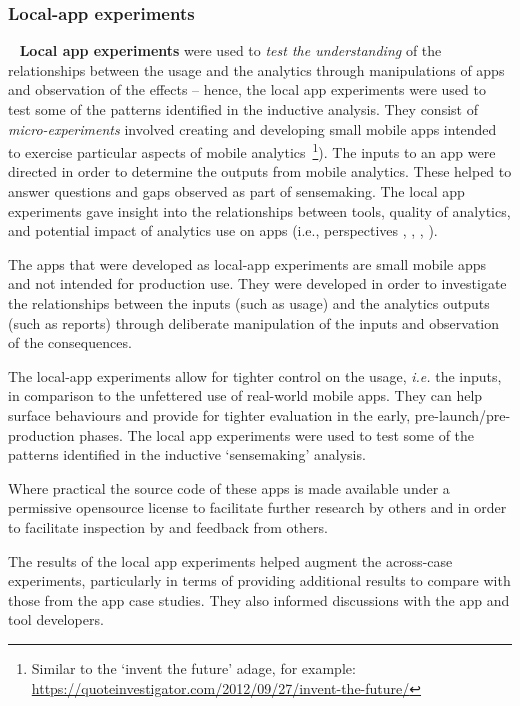 \subsubsection{Local-app experiments}~\label{local-app-experiments-research-method} 
\textbf{Local app experiments} were used to \textit{test the understanding} of the relationships between the usage and the analytics through manipulations of apps and observation of the effects -- hence, the local app experiments were used to test some of the patterns identified in the inductive analysis. They consist of \textit{micro-experiments} involved creating and developing small mobile apps intended to exercise particular aspects of mobile analytics~\footnote{Similar to the `invent the future' adage, for example: \url{https://quoteinvestigator.com/2012/09/27/invent-the-future/}}). The inputs to an app were directed in order to determine the outputs from mobile analytics. These helped to answer questions and gaps observed as part of sensemaking.  The local app experiments gave insight into the relationships between tools, quality of analytics, and potential impact of analytics use on apps (i.e., perspectives \uartefacts, \utools, \iartefacts, \itools). 

The apps that were developed as local-app experiments are small mobile apps and not intended for production use. They were developed in order to investigate the relationships between the inputs (such as usage) and the analytics outputs (such as reports) through deliberate manipulation of the inputs and observation of the consequences.  

The local-app experiments allow for tighter control on the usage, \textit{i.e.} the inputs, in comparison to the unfettered use of real-world mobile apps. They can help surface behaviours and provide for tighter evaluation in the early, pre-launch/pre-production phases. %
The local app experiments were used to test some of the patterns identified in the inductive `sensemaking' analysis.

Where practical the source code of these apps is made available under a permissive opensource license to facilitate further research by others and in order to facilitate inspection by and feedback from others.

The results of the local app experiments helped augment the across-case experiments, particularly in terms of providing additional results to compare with those from the app case studies. They also informed discussions with the app and tool developers. 

